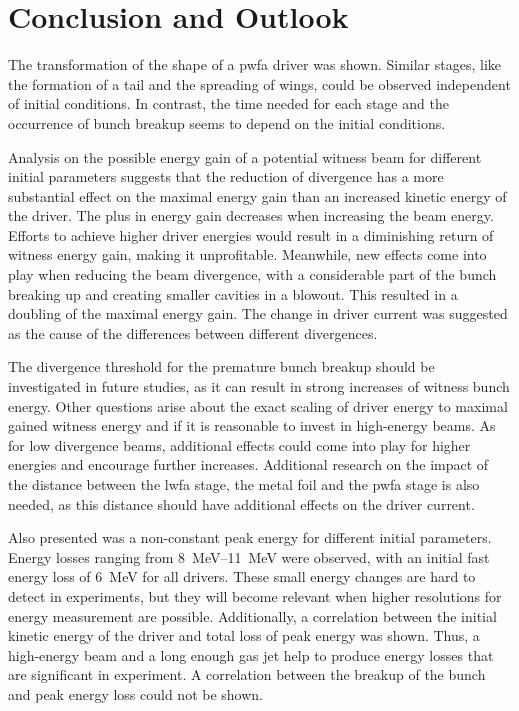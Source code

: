\documentclass[bachelor_thesis]{subfiles}
\begin{document}
\chapter{Conclusion and Outlook} \label{chap:conclusion}
The transformation of the shape of a \gls{pwfa} driver was shown. Similar stages, like the formation of a tail and the spreading of wings, could be observed independent of initial conditions. 
In contrast, the time needed for each stage and the occurrence of bunch breakup seems to depend on the initial conditions.

Analysis on the possible energy gain of a potential witness beam for different initial parameters suggests that the reduction of divergence has a more substantial effect on the maximal energy gain than an increased kinetic energy of the driver.
The plus in energy gain decreases when increasing the beam energy. Efforts to achieve higher driver energies would result in a diminishing return of witness energy gain, making it unprofitable.
Meanwhile, new effects come into play when reducing the beam divergence, with a considerable part of the bunch breaking up and creating smaller cavities in a blowout. This resulted in a doubling of the maximal energy gain.
The change in driver current was suggested as the cause of the differences between different divergences.

The divergence threshold for the premature bunch breakup should be investigated in future studies, as it can result in strong increases of witness bunch energy.
Other questions arise about the exact scaling of driver energy to maximal gained witness energy and if it is reasonable to invest in high-energy beams. As for low divergence beams, additional effects could come into play for higher energies and encourage further increases.
Additional research on the impact of the distance between the \gls{lwfa} stage, the metal foil and the \gls{pwfa} stage is also needed, as this distance should have additional effects on the driver current.

Also presented was a non-constant peak energy for different initial parameters. Energy losses ranging from \qtyrange{8}{11}{\MeV} were observed, with an initial fast energy loss of \qty{6}{\MeV} for all drivers.
These small energy changes are hard to detect in experiments, but they will become relevant when higher resolutions for energy measurement are possible. 
Additionally, a correlation between the initial kinetic energy of the driver and total loss of peak energy was shown. Thus, a high-energy beam and a long enough gas jet help to produce energy losses that are significant in experiment.
A correlation between the breakup of the bunch and peak energy loss could not be shown.
\end{document}
